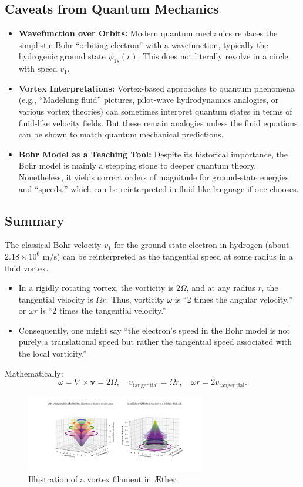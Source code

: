 \subsection{Caveats from Quantum Mechanics}
\begin{itemize}
    \item \textbf{Wavefunction over Orbits:} Modern quantum mechanics replaces the simplistic Bohr ``orbiting electron'' with a wavefunction, typically the hydrogenic ground state $\psi_{1s}(r)$. This does not literally revolve in a circle with speed $v_1$.
    \item \textbf{Vortex Interpretations:} Vortex-based approaches to quantum phenomena (e.g., ``Madelung fluid'' pictures, pilot-wave hydrodynamics analogies, or various vortex theories) can sometimes interpret quantum states in terms of fluid-like velocity fields. But these remain analogies unless the fluid equations can be shown to match quantum mechanical predictions.
    \item \textbf{Bohr Model as a Teaching Tool:} Despite its historical importance, the Bohr model is mainly a stepping stone to deeper quantum theory. Nonetheless, it yields correct orders of magnitude for ground-state energies and ``speeds,'' which can be reinterpreted in fluid-like language if one chooses.
\end{itemize}

\subsection{Summary}
The classical Bohr velocity $v_1$ for the ground-state electron in hydrogen (about $2.18 \times 10^6 \text{ m/s}$) can be reinterpreted as the tangential speed at some radius in a fluid vortex.
\begin{itemize}
    \item In a rigidly rotating vortex, the vorticity is $2\Omega$, and at any radius $r$, the tangential velocity is $\Omega r$. Thus, vorticity $\omega$ is ``2 times the angular velocity,'' or $\omega r$ is ``2 times the tangential velocity.''
    \item Consequently, one might say ``the electron’s speed in the Bohr model is not purely a translational speed but rather the tangential speed associated with the local vorticity.''
\end{itemize}
Mathematically:
\begin{equation}
    \boxed{ \omega = \nabla \times \mathbf{v} = 2\Omega,\quad v_{\text{tangential}} = \Omega r, \quad \omega r = 2 v_{\text{tangential}}. }
\end{equation}


\begin{figure}[h]
    \centering
    \includegraphics[width=0.7\textwidth]{vortex_diagram}
    \caption{Illustration of a vortex filament in \AE ther.}
    \label{fig:vortex}
\end{figure}